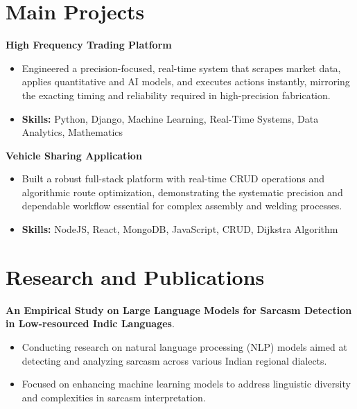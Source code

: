 \documentclass[a4paper,11pt]{article}
\begin{document}
\section{\textbf{Main Projects}}

\vspace{1mm}
  \textbf{High Frequency Trading Platform  }
\vspace{-1.5mm} %
\begin{itemize}
  \item Engineered a precision-focused, real-time system that scrapes market data, applies quantitative and AI models, and executes actions instantly, mirroring the exacting timing and reliability required in high-precision fabrication.
\vspace{-3mm}
  \item \textbf{Skills:} Python, Django, Machine Learning, Real-Time Systems, Data Analytics, Mathematics
\end{itemize}


\vspace{1mm}
   \textbf{Vehicle Sharing Application }
\vspace{-1.5mm} %
\begin{itemize}
  \item Built a robust full-stack platform with real-time CRUD operations and algorithmic route optimization, demonstrating the systematic precision and dependable workflow essential for complex assembly and welding processes.
\vspace{-3mm}
  \item \textbf{Skills:} NodeJS, React, MongoDB, JavaScript, CRUD, Dijkstra Algorithm
\end{itemize}



\section{\textbf{Research and Publications} \hfill }
\vspace{1mm}
  \textbf{An Empirical Study on Large Language Models for Sarcasm Detection in Low-resourced Indic Languages}.
\vspace{-1mm} %
\begin{itemize}
  \item Conducting research on natural language processing (NLP) models aimed at detecting and analyzing sarcasm across various Indian regional dialects.
\vspace{-3mm}
  \item Focused on enhancing machine learning models to address linguistic diversity and complexities in sarcasm interpretation.
\end{itemize}
\end{document}
